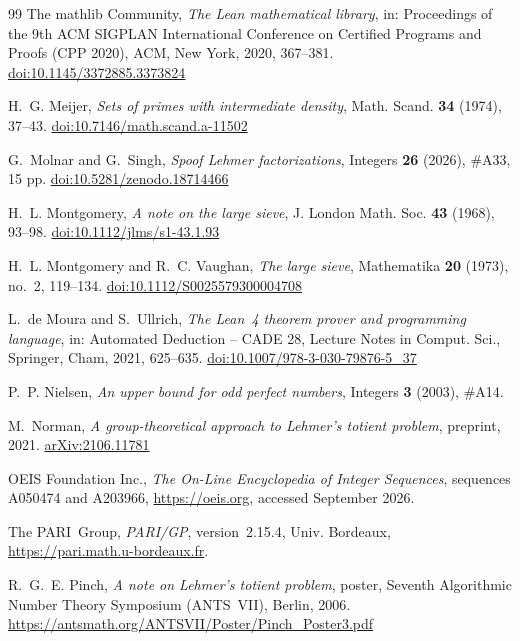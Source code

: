 \documentclass[11pt,reqno]{amsart}
\numberwithin{equation}{section}
\theoremstyle{plain}
\theoremstyle{definition}
\theoremstyle{remark}
\begin{document}
\begin{thebibliography}{99}
The mathlib Community,
\emph{The Lean mathematical library},
in: Proceedings of the 9th ACM SIGPLAN International Conference on
Certified Programs and Proofs (CPP 2020), ACM, New York, 2020, 367--381.
\href{https://doi.org/10.1145/3372885.3373824}{doi:10.1145/3372885.3373824}

H.~G. Meijer,
\emph{Sets of primes with intermediate density},
Math. Scand. \textbf{34} (1974), 37--43.
\href{https://doi.org/10.7146/math.scand.a-11502}{doi:10.7146/math.scand.a-11502}

G.~Molnar and G.~Singh,
\emph{Spoof Lehmer factorizations},
Integers \textbf{26} (2026), \#A33, 15 pp.
\href{https://doi.org/10.5281/zenodo.18714466}{doi:10.5281/zenodo.18714466}

H.~L. Montgomery,
\emph{A note on the large sieve},
J. London Math. Soc. \textbf{43} (1968), 93--98.
\href{https://doi.org/10.1112/jlms/s1-43.1.93}{doi:10.1112/jlms/s1-43.1.93}

H.~L. Montgomery and R.~C. Vaughan,
\emph{The large sieve},
Mathematika \textbf{20} (1973), no.~2, 119--134.
\href{https://doi.org/10.1112/S0025579300004708}{doi:10.1112/S0025579300004708}

L.~de Moura and S.~Ullrich,
\emph{The Lean~4 theorem prover and programming language},
in: Automated Deduction -- CADE 28, Lecture Notes in Comput. Sci.,
Springer, Cham, 2021, 625--635.
\href{https://doi.org/10.1007/978-3-030-79876-5_37}{doi:10.1007/978-3-030-79876-5\_37}

P.~P. Nielsen,
\emph{An upper bound for odd perfect numbers},
Integers \textbf{3} (2003), \#A14.

M.~Norman,
\emph{A group-theoretical approach to Lehmer's totient problem},
preprint, 2021.
\href{https://arxiv.org/abs/2106.11781}{arXiv:2106.11781}

OEIS Foundation Inc.,
\emph{The On-Line Encyclopedia of Integer Sequences},
sequences A050474 and A203966, \url{https://oeis.org}, accessed
September 2026.

The PARI~Group,
\emph{PARI/GP}, version~2.15.4, Univ. Bordeaux,
\url{https://pari.math.u-bordeaux.fr}.

R.~G.~E. Pinch,
\emph{A note on Lehmer's totient problem},
poster, Seventh Algorithmic Number Theory Symposium (ANTS~VII), Berlin, 2006.
\url{https://antsmath.org/ANTSVII/Poster/Pinch_Poster3.pdf}


\end{thebibliography}
\end{document}
